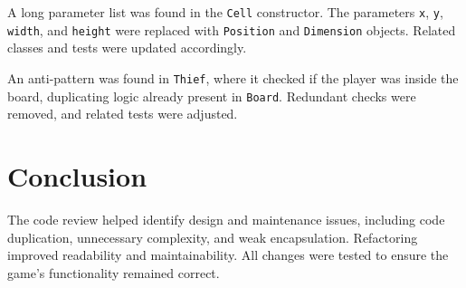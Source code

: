 \documentclass[11pt]{article}
\begin{document}
A long parameter list was found in the \texttt{Cell} constructor. The parameters \texttt{x}, \texttt{y}, \texttt{width}, and \texttt{height} were replaced with \texttt{Position} and \texttt{Dimension} objects. Related classes and tests were updated accordingly.

An anti-pattern was found in \texttt{Thief}, where it checked if the player was inside the board, duplicating logic already present in \texttt{Board}. Redundant checks were removed, and related tests were adjusted.

\section*{Conclusion}

The code review helped identify design and maintenance issues, including code duplication, unnecessary complexity, and weak encapsulation. Refactoring improved readability and maintainability. All changes were tested to ensure the game’s functionality remained correct.
\end{document}
